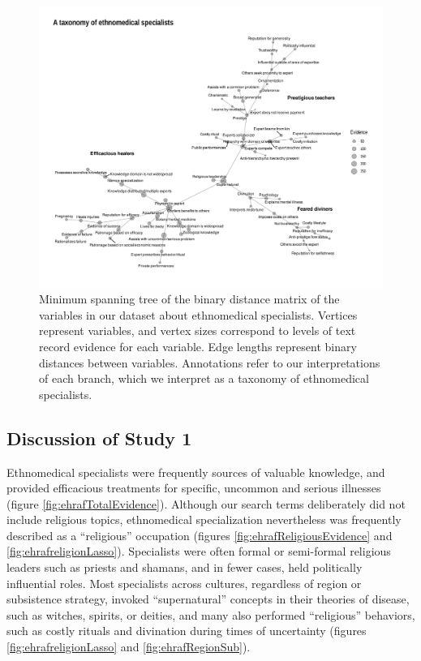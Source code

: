 \documentclass[
  11pt,
]{article}
\begin{document}
\begin{landscape}

\begin{figure}[p]

{\centering \includegraphics{magic-healers-article2_files/figure-latex/ehrafmsttaxonomy-1} 

}

\caption{Minimum spanning tree of the binary distance matrix of the variables in our dataset about ethnomedical specialists. Vertices represent variables, and vertex sizes correspond to levels of text record evidence for each variable. Edge lengths represent binary distances between variables. Annotations refer to our interpretations of each branch, which we interpret as a taxonomy of ethnomedical specialists.}\label{fig:ehrafmsttaxonomy}
\end{figure}

\end{landscape}

\hypertarget{discussion-of-study-1}{%
\subsection{Discussion of Study 1}\label{discussion-of-study-1}}

Ethnomedical specialists were frequently sources of valuable knowledge, and provided efficacious treatments for specific, uncommon and serious illnesses (figure \ref{fig:ehrafTotalEvidence}). Although our search terms deliberately did not include religious topics, ethnomedical specialization nevertheless was frequently described as a ``religious'' occupation (figures \ref{fig:ehrafReligiousEvidence} and \ref{fig:ehrafreligionLasso}). Specialists were often formal or semi-formal religious leaders such as priests and shamans, and in fewer cases, held politically influential roles. Most specialists across cultures, regardless of region or subsistence strategy, invoked ``supernatural'' concepts in their theories of disease, such as witches, spirits, or deities, and many also performed ``religious'' behaviors, such as costly rituals and divination during times of uncertainty (figures \ref{fig:ehrafreligionLasso} and \ref{fig:ehrafRegionSub}).
\end{document}
